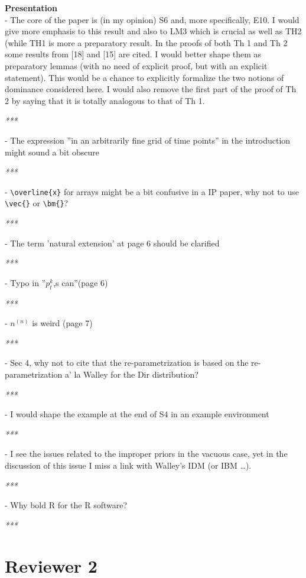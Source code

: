 \documentclass[12pt, a4paper]{elsarticle}
\newcommand{\bs}[1]{\boldsymbol{#1}}
\renewcommand{\vec}[1]{{\bs#1}}
\begin{document}
\textbf{Presentation}\\
- The core of the paper is (in my opinion) S6 and, more specifically, E10. I would give more emphasis to this result and also to LM3 which is crucial as well as TH2 (while TH1 is more a preparatory result. In the proofs of both Th 1 and Th 2 some results from [18] and [15] are cited. I would better shape them as preparatory lemmas (with no need of explicit proof, but with an explicit statement). This would be a chance to explicitly formalize the two notions of dominance considered here. I would also remove the first part of the proof of Th 2 by saying that it is totally analogous to that of Th 1.

\medskip
\emph{***}
\medskip

- The expression ''in an arbitrarily fine grid of time points'' in the introduction might sound a bit obscure

\medskip
\emph{***}
\medskip

- \verb+\overline{x}+ for arrays might be a bit confusive in a IP paper, why not to use \verb+\vec{}+ or \verb+\bm{}+?

\medskip
\emph{***}
\medskip

- The term 'natural extension' at page 6 should be clarified

\medskip
\emph{***}
\medskip

- Typo in ''$p_t^k$,s can''(page 6)

\medskip
\emph{***}
\medskip

- $n^{(n)}$ is weird (page 7)

\medskip
\emph{***}
\medskip

- Sec 4, why not to cite that the re-parametrization is based on the re-parametrization a' la Walley for the Dir distribution?

\medskip
\emph{***}
\medskip

- I would shape the example at the end of S4 in an example environment

\medskip
\emph{***}
\medskip

- I see the issues related to the improper priors in the vacuous case, yet in the discussion of this issue I miss a link with Walley's IDM (or IBM …).

\medskip
\emph{***}
\medskip

- Why bold R for the R software?

\medskip
\emph{***}
\medskip


\section*{Reviewer 2}
\end{document}
